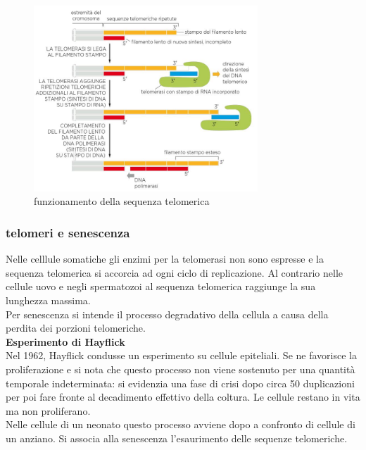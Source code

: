             \begin{figure}[h]
                \centering
                \includegraphics[width=0.75\textwidth]{images/telomero.JPG}
                \caption{\small funzionamento della sequenza telomerica}
                \label{fig:mesh1}
            \end{figure}
            
            \subsubsection{telomeri e senescenza}
                Nelle celllule somatiche gli enzimi per la telomerasi non sono espresse e la sequenza telomerica si accorcia ad ogni ciclo di replicazione. 
                Al contrario nelle cellule uovo e negli spermatozoi al sequenza telomerica raggiunge la sua lunghezza massima.\\
                Per senescenza si intende il processo degradativo della cellula a causa della perdita dei porzioni telomeriche.\\
                
                \textbf{Esperimento di Hayflick}\\
                Nel 1962, Hayflick condusse un esperimento su cellule epiteliali. Se ne favorisce la proliferazione e si nota che questo processo non viene sostenuto per una quantità temporale indeterminata:
                si evidenzia una fase di crisi dopo circa 50 duplicazioni per poi fare fronte al decadimento effettivo della coltura. Le cellule restano in vita ma non proliferano.\\
                Nelle cellule di un neonato questo processo avviene dopo a confronto di cellule di un anziano. Si associa alla senescenza l'esaurimento delle sequenze telomeriche.
